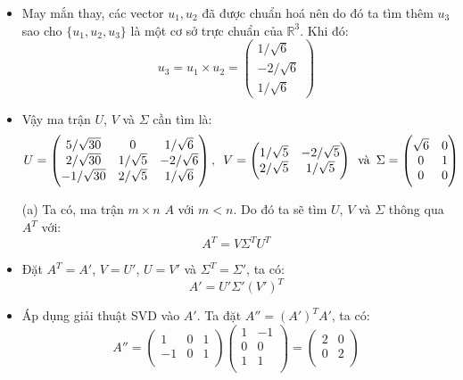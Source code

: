 \documentclass[a4paper, 12pt]{report}
\begin{document}
\begin{itemize}
    \item May mắn thay, các vector $u_1, u_2$ đã được chuẩn hoá nên do đó ta tìm thêm $u_3$ sao cho $\{u_1, u_2, u_3\}$ là một cơ sở trực chuẩn của $\mathbb{R}^3$. Khi đó:
    $$
    u_3 = u_1 \times u_2 =
    \begin{pmatrix}
       1 / \sqrt{6} \\
       -2 / \sqrt{6} \\
       1 / \sqrt{6}
    \end{pmatrix}
    $$

    \item Vậy ma trận $U$, $V$ và $\Sigma$ cần tìm là:
    $$
    U = \begin{pmatrix}
        5/ \sqrt{30} & 0 & 1 / \sqrt{6} \\
        2 / \sqrt{30} & 1/\sqrt{5} & -2 / \sqrt{6} \\
        -1 / \sqrt{30} & 2/\sqrt{5} & 1 / \sqrt{6}
    \end{pmatrix},
    \hspace*{5pt}
    V =
    \begin{pmatrix}
        1 / \sqrt{5} & -2 / \sqrt{5} \\
        2 / \sqrt{5} & 1 / \sqrt{5}
    \end{pmatrix}
    \hspace*{5pt}
    \text{và}
    \hspace*{5pt}
    \Sigma = 
    \begin{pmatrix}
        \sqrt{6} & 0 \\
        0 & 1  \\
        0 & 0 
    \end{pmatrix}
    $$

    \item[(a)] Ta có, ma trận $m \times n$ $A$ với $m < n$. Do đó ta sẽ tìm $U$, $V$ và $\Sigma$ thông qua $A^T$ với:
    $$
    A^T = V \Sigma^T U^T
    $$

    \item Đặt $A^T = A'$, $V = U'$, $U = V'$ và $\Sigma^T = \Sigma'$, ta có:
    $$
    A' = U' \Sigma' (V')^T
    $$

    \item Áp dụng giải thuật SVD vào $A'$. Ta đặt $A'' = (A')^T A'$, ta có:
    $$
    A'' = \begin{pmatrix}
        1 & 0 & 1 \\ 
        -1 & 0 & 1 \\
    \end{pmatrix}
    \begin{pmatrix}
        1 & -1 \\ 
        0 & 0 \\
        1 & 1 \\
    \end{pmatrix} = 
    \begin{pmatrix}
        2 & 0 \\
        0 & 2 \\
    \end{pmatrix}
    $$


\end{itemize}
\end{document}
